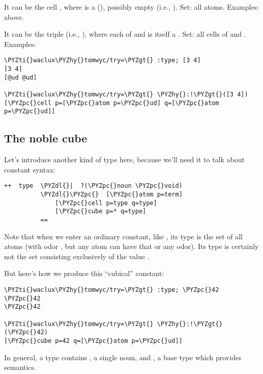 It can be the cell \kode{[\%atom p]}, where  is a  (),
possibly empty (i.e., ).  Set: all atoms.  Examples: above.

It can be the triple \kode{[\%cell p q]} (i.e., \kode{[\%cell [p q]]}), where
each of  and  is itself a .  Set: all cells of 
and .  Examples:

\begin{framed_shaded}
\begin{Verbatim}[fontsize=\relsize{-2.5},fontseries=b,commandchars=\\\{\}]
\PYZti{}waclux\PYZhy{}tomwyc/try=\PYZgt{} :type; [3 4]
[3 4]
[@ud @ud]

\PYZti{}waclux\PYZhy{}tomwyc/try=\PYZgt{} \PYZhy{}:!\PYZgt{}([3 4])
[\PYZpc{}cell p=[\PYZpc{}atom p=\PYZpc{}ud] q=[\PYZpc{}atom p=\PYZpc{}ud]]
\end{Verbatim}
\end{framed_shaded}

\subsection{The noble cube}

Let's introduce another kind of type here, because we'll need it
to talk about constant syntax:

\begin{framed_shaded}
\begin{Verbatim}[fontsize=\relsize{-2.5},fontseries=b,commandchars=\\\{\}]
++  type  \PYZdl{}|  ?(\PYZpc{}noun \PYZpc{}void)
          \PYZdl{}\PYZpc{}  [\PYZpc{}atom p=term]
              [\PYZpc{}cell p=type q=type]
              [\PYZpc{}cube p=* q=type]
          ==
\end{Verbatim}
\end{framed_shaded}
Note that when we enter an ordinary constant, like , its type
\kode{[\%atom \%ud]} is the set of all atoms (with odor , but any
atom can have that or any odor).  Its type is certainly not the
set consisting exclusively of the value .

But here's how we produce this ``cubical'' constant:

\begin{framed_shaded}
\begin{Verbatim}[fontsize=\relsize{-2.5},fontseries=b,commandchars=\\\{\}]
\PYZti{}waclux\PYZhy{}tomwyc/try=\PYZgt{} :type; \PYZpc{}42
\PYZpc{}42
\PYZpc{}42

\PYZti{}waclux\PYZhy{}tomwyc/try=\PYZgt{} \PYZhy{}:!\PYZgt{}(\PYZpc{}42)
[\PYZpc{}cube p=42 q=[\PYZpc{}atom p=\PYZpc{}ud]]
\end{Verbatim}
\end{framed_shaded}
In general, a  type contains , a single noun, and ,
a base type which provides semantics.

